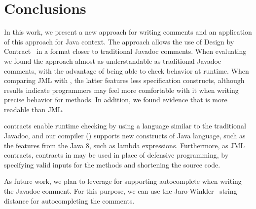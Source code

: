 \section{Conclusions}
\label{sec:conclusions}

In this work, we present a new approach for writing comments and an
application of this approach for Java context. The approach
allows the use of Design by Contract~\cite{dbc} in a format closer to
traditional Javadoc comments. When evaluating \contractjdoc{} we found the
approach almost as understandable as traditional Javadoc comments, with the
advantage of being able to check behavior at runtime.
When comparing JML with \contractjdoc{}, the latter features less specification
constructs, although results indicate programmers may feel more comfortable with
it when writing precise behavior for methods. In addition, we found evidence
that \contractjdoc{} is more readable than JML.

\contractjdoc{} contracts enable runtime checking by using a language similar to the traditional Javadoc,
and our compiler (\contractjdocCompiler{}) supports new constructs of Java language, such as the
features from the Java 8, such as lambda expressions.
Furthermore, as JML contracts, contracts in \contractjdoc{} may be used in place of defensive
programming, by specifying valid inputs for the methods and shortening the source code.

As future work, we plan to leverage \contractjdoc{} for
supporting autocomplete when writing the Javadoc comment. For this purpose, we
can use the Jaro-Winkler~\cite{jaro,winkler99} string distance for
autocompleting the comments.